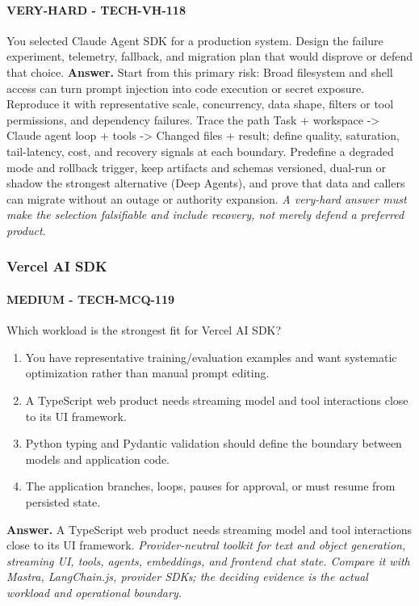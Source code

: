 \paragraph{VERY-HARD - TECH-VH-118} You selected Claude Agent SDK for a production system. Design the failure experiment, telemetry, fallback, and migration plan that would disprove or defend that choice.
\textbf{Answer.} Start from this primary risk: Broad filesystem and shell access can turn prompt injection into code execution or secret exposure. Reproduce it with representative scale, concurrency, data shape, filters or tool permissions, and dependency failures. Trace the path Task + workspace -> Claude agent loop + tools -> Changed files + result; define quality, saturation, tail-latency, cost, and recovery signals at each boundary. Predefine a degraded mode and rollback trigger, keep artifacts and schemas versioned, dual-run or shadow the strongest alternative (Deep Agents), and prove that data and callers can migrate without an outage or authority expansion.
\textit{A very-hard answer must make the selection falsifiable and include recovery, not merely defend a preferred product.}
\subsubsection*{Vercel AI SDK}
\paragraph{MEDIUM - TECH-MCQ-119} Which workload is the strongest fit for Vercel AI SDK?
\begin{enumerate}[label=\Alph*.]
\item You have representative training/evaluation examples and want systematic optimization rather than manual prompt editing.
\item A TypeScript web product needs streaming model and tool interactions close to its UI framework.
\item Python typing and Pydantic validation should define the boundary between models and application code.
\item The application branches, loops, pauses for approval, or must resume from persisted state.
\end{enumerate}
\textbf{Answer.} A TypeScript web product needs streaming model and tool interactions close to its UI framework.
\textit{Provider-neutral toolkit for text and object generation, streaming UI, tools, agents, embeddings, and frontend chat state. Compare it with Mastra, LangChain.js, provider SDKs; the deciding evidence is the actual workload and operational boundary.}
